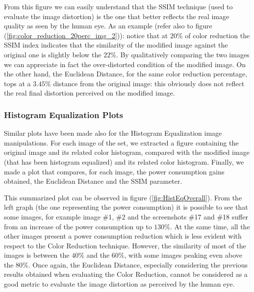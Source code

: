 \documentclass[a4paper]{article}
\begin{document}
            From this figure we can easily understand that the SSIM technique (used to evaluate the image distortion) is the one that better reflects the real image quality as seen by the human eye. As an example (refer also to figure (\ref{fig:color_reduction_20perc_img_2})): notice that at $20\%$ of color reduction the SSIM index indicates that the similarity of the modified image against the original one is slightly below the $22\%$. By qualitatively comparing the two images we can appreciate in fact the over-distorted condition of the modified image. On the other hand, the Euclidean Distance, for the same color reduction percentage, tops at a $3.45\%$ distance from the original image: this obviously does not reflect the real final distortion perceived on the modified image.

        \subsubsection{Histogram Equalization Plots}
            Similar plots have been made also for the Histogram Equalization image manipulations. For each image of the set, we extracted a figure containing the original image and its related color histogram, compared with the modified image (that has been histogram equalized) and its related color histogram.
            Finally, we made a plot that compares, for each image, the power consumption gains obtained, the Euclidean Distance and the SSIM parameter.

            This summarized plot can be observed in figure (\ref{fig:HistEqOverall}).
            From the left graph (the one representing the power consumption) it is possible to see that some images, for example image \#1, \#2 and the screenshots \#17 and \#18 suffer from an increase of the power consumption up to $130\%$. At the same time, all the other images present a power consumption reduction which is less evident with respect to the Color Reduction technique. However, the similarity of most of the images is between the $40\%$ and the $60\%$, with some images peaking even above the $80\%$. Once again, the Euclidean Distance, especially considering the previous results obtained when evaluating the Color Reduction, cannot be considered as a good metric to evaluate the image distortion as perceived by the human eye.
\end{document}

